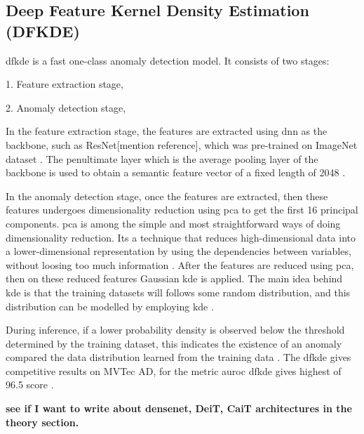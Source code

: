 \subsection{Deep Feature Kernel Density Estimation (DFKDE)}
\label{subsec:dfkde}

\gls{dfkde} is a fast one-class anomaly detection model. It consists of two stages:

1. Feature extraction stage,

2. Anomaly detection stage,

In the feature extraction stage, the features are extracted using \gls{dnn} as the backbone, such as ResNet[mention reference], which was pre-trained on ImageNet\cite{5206848} dataset \cite{10208786}. The penultimate layer which is the average pooling layer of the backbone is used to obtain a semantic feature vector of a fixed length of 2048 \cite{Anomalib2024}.

In the anomaly detection stage, once the features are extracted, then these features undergoes dimensionality reduction using \gls{pca}\cite{IBM2023} to get the first 16 principal components. \gls{pca} is among the simple and most straightforward ways of doing dimensionality reduction. Its a technique that reduces high-dimensional data into a lower-dimensional representation by using the dependencies between variables, without loosing too much information \cite{Shalizi2012}. After the features are reduced using \gls{pca}, then on these reduced features Gaussian \gls{kde} is applied. The main idea behind \gls{kde} is that the training datasets will follows some random distribution, and this distribution can be modelled by employing \gls{kde} \cite{10208786}.

During inference, if a lower probability density is observed below the threshold determined by the training dataset, this indicates the existence of an anomaly compared the data distribution learned from the training data \cite{10208786}. The \gls{dfkde} gives competitive results on MVTec AD\cite{8954181}, for the metric \gls{auroc} \gls{dfkde} gives highest of 96.5 score \cite{Anomalib2024}.

\textbf{see if I want to write about densenet, DeiT, CaiT architectures in the theory section.}

